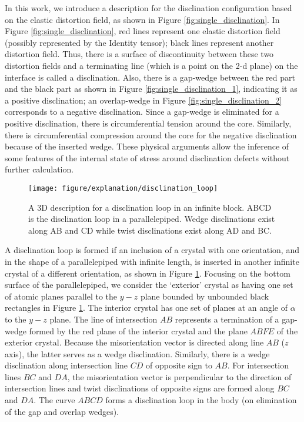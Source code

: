 \documentclass[11pt,letterpaper]{article}
\begin{document}
In this work, we introduce a description for the disclination configuration based on the elastic distortion field, as shown in Figure \ref{fig:single_disclination}. In Figure \ref{fig:single_disclination}, red lines represent one elastic  distortion field (possibly represented by the Identity tensor); black lines represent another distortion field. Thus, there is a surface of discontinuity between these two distortion fields and a terminating line (which is a point on the 2-d plane) on the interface is called a disclination. Also, there is a gap-wedge between the red part and the black part as shown in Figure \ref{fig:single_disclination_1}, indicating it as a positive disclination; an overlap-wedge in Figure \ref{fig:single_disclination_2} corresponds to a negative disclination. Since a gap-wedge is eliminated for a positive disclination, there is circumferential tension around the core. Similarly, there is circumferential compression around the core for the negative disclination because of the inserted wedge. These physical arguments allow the inference of some features of the internal state of stress around disclination defects without further calculation.

\begin {figure}
\centering
\texttt{[image: figure/explanation/disclination\_loop]}
\caption{A 3D description for a disclination loop in an infinite block. ABCD is the disclination loop in a parallelepiped. Wedge disclinations exist along AB and CD while twist disclinations exist along AD and BC.}\label{fig:loop_disclination}
\end {figure}

A disclination loop is formed if an inclusion of a crystal with one orientation, and in the shape of a parallelepiped with infinite length, is inserted in another infinite crystal of a different orientation, as shown in Figure \ref{fig:loop_disclination}. Focusing on the bottom surface of the parallelepiped, we consider the `exterior' crystal as having one set of atomic planes parallel to the $y-z$ plane bounded by unbounded black rectangles in Figure \ref{fig:loop_disclination}. The interior crystal has one set of planes at an angle of $\alpha$  to the $y-z$ plane. The line of intersection $AB$ represents a termination of a gap-wedge formed by the red plane of the interior crystal and the plane $ABFE$ of the exterior crystal. Because the misorientation vector is directed along line $AB$ ($z$ axis), the latter serves as a wedge disclination. Similarly, there is a wedge disclination along intersection line $CD$ of opposite sign to $AB$. For intersection lines $BC$ and $DA$, the misorientation vector is perpendicular to the direction of intersection lines and twist disclinations of opposite signs are formed along $BC$ and $DA$. The curve $ABCD$ forms a disclination loop in the body (on elimination of the gap and overlap wedges). 
\end{document}

